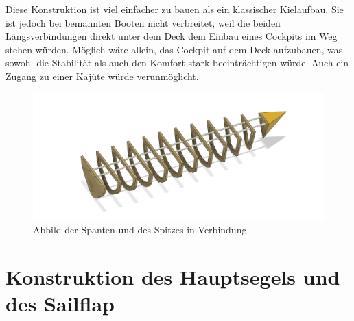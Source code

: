 Diese Konstruktion ist viel einfacher zu bauen als ein klassischer Kielaufbau. Sie ist jedoch bei bemannten Booten nicht verbreitet, weil die beiden Längsverbindungen direkt unter dem Deck dem Einbau eines Cockpits im Weg stehen würden. Möglich wäre allein, das Cockpit auf dem Deck aufzubauen, was sowohl die Stabilität als auch den Komfort stark beeinträchtigen würde. Auch ein Zugang zu einer Kajüte würde verunmöglicht.
\begin{figure}[H]
    \centering
    \includegraphics[width=1\linewidth]{assets/full_skellet.png}
    \caption{Abbild der Spanten und des Spitzes in Verbindung}
    
\end{figure}


\section{Konstruktion des Hauptsegels und des Sailflap}


